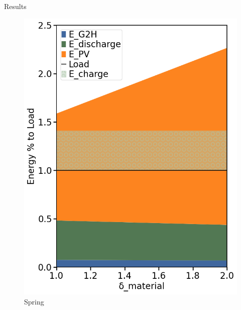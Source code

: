 \begin{frame}[c]{Results}
\begin{itemize}
\begin{figure}[htbp]
\begin{minipage}{0.24\linewidth}
                    \includegraphics[width=\linewidth]{Figures/spring.png}
                    \footnotesize
                    \caption{Spring}
                \end{minipage}\hfill
                \begin{minipage}{0.24\linewidth}

\end{minipage}
\end{figure}
\end{itemize}
\end{frame}
